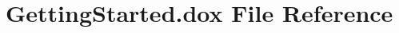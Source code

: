 \hypertarget{GettingStarted_8dox}{}\section{Getting\+Started.\+dox File Reference}
\label{GettingStarted_8dox}

